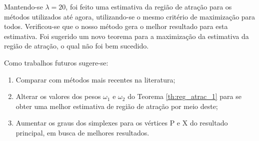 Mantendo-se $\lambda = 20$, foi feito uma estimativa da região de atração para os métodos utilizados até agora, utilizando-se o mesmo critério de maximização para todos. Verificou-se que o nosso método gera o melhor resultado para esta estimativa. Foi sugerido um novo teorema para a maximização da estimativa da região de atração, o qual não foi bem sucedido.

Como trabalhos futuros sugere-se:
\begin{enumerate}
\item Comparar com métodos mais recentes na literatura;
\item Alterar os valores dos pesos $\omega_1$ e $\omega_2$ do Teorema \ref{th:reg_atrac_1} para se obter uma melhor estimativa de região de atração por meio deste;
\item Aumentar os graus dos simplexes para os vértices P e X do resultado principal, em busca de melhores resultados.
\end{enumerate}